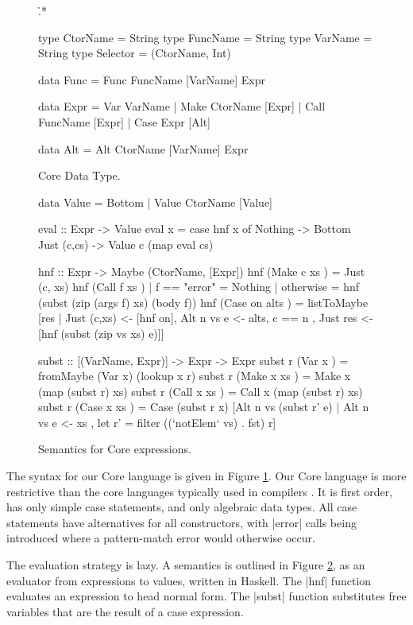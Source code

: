 \documentclass[preprint]{sigplanconf}
\begin{document}
\begin{figure}
\h{.*}\begin{code}
type CtorName  =  String
type FuncName  =  String
type VarName   =  String
type Selector  =  (CtorName, Int)

data Func  =  Func FuncName [VarName] Expr

data Expr  =  Var   VarName
           |  Make  CtorName  [Expr]
           |  Call  FuncName  [Expr]
           |  Case  Expr      [Alt]

data Alt   =  Alt CtorName [VarName] Expr
\end{code}
\caption{Core Data Type.}
\label{fig:core}
\end{figure}

\begin{figure}
\begin{code}
data Value = Bottom | Value CtorName [Value]

eval :: Expr -> Value
eval x = case  hnf x of
               Nothing      -> Bottom
               Just (c,cs)  -> Value c (map eval cs)

hnf :: Expr -> Maybe (CtorName, [Expr])
hnf (Make  c   xs    )  =  Just (c, xs)
hnf (Call  f  xs     )
    | f == "error"   = Nothing
    | otherwise      = hnf (subst (zip (args f) xs) (body f))
hnf (Case  on  alts  )  =  listToMaybe [res
       |  Just (c,xs) <- [hnf on], Alt n vs e <- alts, c == n
       ,  Just res <- [hnf (subst (zip vs xs) e)]]

subst :: [(VarName, Expr)] -> Expr -> Expr
subst r (Var   x     ) = fromMaybe (Var x) (lookup x r)
subst r (Make  x xs  ) = Make  x (map (subst r) xs)
subst r (Call  x xs  ) = Call  x (map (subst r) xs)
subst r (Case  x xs  ) = Case (subst r x)
    [Alt n vs (subst r' e) | Alt n vs e <- xs
    , let r' = filter ((`notElem` vs) . fst) r]
\end{code}
\caption{Semantics for Core expressions.}
\label{fig:semantics}
\end{figure}

The syntax for our Core language is given in Figure \ref{fig:core}. Our Core language is more restrictive than the core languages typically used in compilers \cite{ghc_core}. It is first order, has only simple case statements, and only algebraic data types. All case statements have alternatives for all constructors, with |error| calls being introduced where a pattern-match error would otherwise occur.

The evaluation strategy is lazy. A semantics is outlined in Figure \ref{fig:semantics}, as an evaluator from expressions to values, written in Haskell. The |hnf| function evaluates an expression to head normal form. The |subst| function substitutes free variables that are the result of a case expression.
\end{document}
